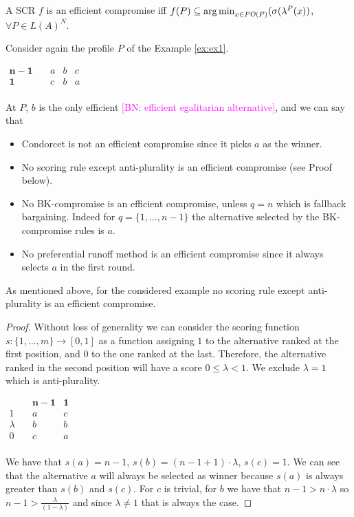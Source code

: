 \documentclass[version=3.21, pagesize, notitlepage, twoside=off, bibliography=totoc, DIV=calc, fontsize=12pt, a4paper]{scrartcl}
\newcommand{\commentBN}[1]{\textcolor{magenta}{\small$\big[$BN: #1$\big]$}}
\newcommand{\paretopt}{\mathit{PO}}
\begin{document}
\begin{definition}
	A SCR $f$ is an efficient compromise iff $f(P) \subseteq \argmin_{x \in \paretopt(P)} (\sigma(\lambda^P(x))$, $\forall P \in L(A)^N$.
\end{definition}

\noindent Consider again the profile $P$ of the Example \ref{ex:ex1}. 
	\begin{center}
		$
		\begin{array}{cccc}
		\mathbf{n-1} \quad &a&b&c\\
		\mathbf{1} \quad &c&b&a\\
		\end{array}
		$
	\end{center}
	At $P$, $b$ is the only efficient \commentBN{efficient egalitarian alternative}, and we can say that 
\begin{itemize}
	\item Condorcet is not an efficient compromise since it picks $a$ as the winner.
	\item No scoring rule except anti-plurality is an efficient compromise (see Proof below).
	\item No BK-compromise is an efficient compromise, unless $q=n$ which is fallback bargaining. Indeed for $q=\{1,\dots, n-1\}$ the alternative selected by the BK-compromise rules is $a$.
	\item No preferential runoff method is an efficient compromise since it always selects $a$ in the first round.
\end{itemize}
As mentioned above, for the considered example no scoring rule except anti-plurality is an efficient compromise.
\begin{proof} Without loss of generality we can consider the scoring function $s:\{1,\dots,m\}\rightarrow [0,1]$ as a function assigning $1$ to the alternative ranked at the first position, and $0$ to the one ranked at the last. Therefore, the alternative ranked in the second position will have a score $0 \leq \lambda<1$. We exclude $\lambda = 1$ which is anti-plurality.
	\begin{center}
		$
		\begin{array}{ccc}
		\quad & \mathbf{n-1} &\mathbf{1}\\
		1 \quad &a&c\\
		\lambda \quad &b&b\\
		0 \quad &c&a\\
		\end{array}
		$
	\end{center}
	We have that $s(a)=n-1$, $s(b)=(n-1+1)\cdot \lambda$, $s(c)=1$. We can see that the alternative $a$ will always be selected as winner because $s(a)$ is always greater than $s(b)$ and $s(c)$. For $c$ is trivial, for $b$ we have that $n-1>n\cdot\lambda$ so $n-1>\frac{\lambda}{(1-\lambda)}$ and since $\lambda \neq 1$ that is always the case.
\end{proof}
\end{document}
